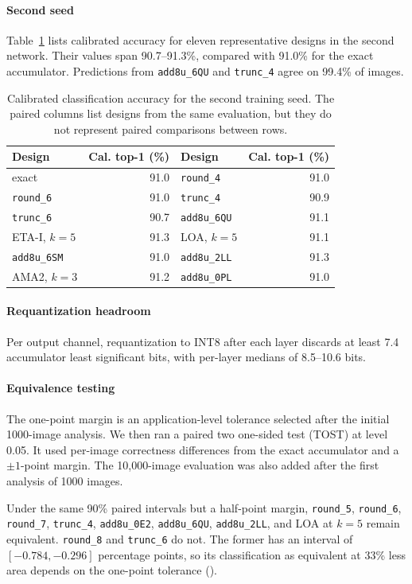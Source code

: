 \documentclass[11pt]{article}
\begin{document}
\paragraph{Second seed}
Table~\ref{tab:secondseed} lists calibrated accuracy for eleven
representative designs in the second network. Their values span
90.7--91.3\%, compared with 91.0\% for the exact accumulator.
Predictions from \texttt{add8u\_6QU} and \texttt{trunc\_4} agree on 99.4\%
of images.
\begin{table}[t]
\centering
\caption{Calibrated classification accuracy for the second training seed.
The paired columns list designs from the same evaluation, but they do not
represent paired comparisons between rows.}
\label{tab:secondseed}
\begin{tabular}{lr@{\qquad}lr}
\toprule
Design & Cal. top-1 (\%) & Design & Cal. top-1 (\%)\\
\midrule
exact & 91.0 & \texttt{round\_4} & 91.0\\
\texttt{round\_6} & 91.0 & \texttt{trunc\_4} & 90.9\\
\texttt{trunc\_6} & 90.7 & \texttt{add8u\_6QU} & 91.1\\
ETA-I, $k=5$ & 91.3 & LOA, $k=5$ & 91.1\\
\texttt{add8u\_6SM} & 91.0 & \texttt{add8u\_2LL} & 91.3\\
AMA2, $k=3$ & 91.2 & \texttt{add8u\_0PL} & 91.0\\
\bottomrule
\end{tabular}
\end{table}
\paragraph{Requantization headroom}
Per output channel, requantization to INT8 after each layer discards at
least 7.4 accumulator least significant bits, with per-layer medians of
8.5--10.6 bits.

\paragraph{Equivalence testing}
The one-point margin is an application-level tolerance selected after the
initial 1000-image analysis. We then ran a paired two one-sided test (TOST)
at level 0.05. It used per-image correctness differences from the exact
accumulator and a $\pm1$-point margin. The 10{,}000-image evaluation was
also added after the first analysis of 1000 images.

Under the same 90\% paired intervals but a half-point margin,
\texttt{round\_5}, \texttt{round\_6}, \texttt{round\_7},
\texttt{trunc\_4}, \texttt{add8u\_0E2}, \texttt{add8u\_6QU},
\texttt{add8u\_2LL}, and LOA at $k=5$ remain equivalent.
\texttt{round\_8} and \texttt{trunc\_6} do not. The former has an interval of
$[-0.784,-0.296]$ percentage points, so its classification as
equivalent at 33\% less area depends on the one-point tolerance
().
\end{document}
